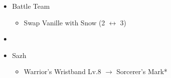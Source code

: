 \begin{menu}
	\begin{itemize}
		\paradigm
		\begin{itemize}
			\item Battle Team
				\begin{itemize}
					\item Swap Vanille with Snow (2 $\leftrightarrow$ 3)
				\end{itemize}
			\item {}%
				  {\paradigmline{\syn}{(\sen)}{(\rav)}}%
			      {\paradigmline[4]{\com}{\rav}{\rav}}%
			      {\paradigmline{(\rav)}{(\sen)}{(\rav)}}%
			      {\paradigmline{\com}{\com}{\rav}}%
			      {\paradigmline{\rav}{(\sen)}{\sab}}%
			      {\paradigmline{\com}{\com}{(\rav)}}%
		\end{itemize}
		\equip
		\begin{itemize}
			\item Sazh
				\begin{itemize}
					\item Warrior's Wristband Lv.8 $\rightarrow$ Sorcerer's Mark*
				\end{itemize}
		\end{itemize}
	\end{itemize}
\end{menu}

\renewcommand{\first}{[1] Riot Shield (\syn/\sen/\rav)}
\renewcommand{\third}{[3] Mystic Tower (\rav/\sen/\rav)}
\renewcommand{\fourth}{[4] Aggression (\com/\com/\rav)}
\renewcommand{\fifth}{[5] Matador (\rav/\sen/\sab)}
\renewcommand{\sixth}{[6] Aggression (\com/\com/\rav)}

